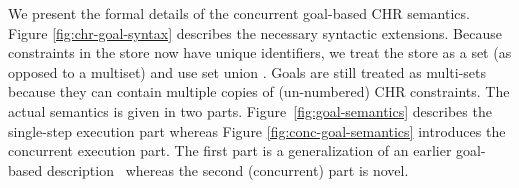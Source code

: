 \documentclass{tlp}
\begin{document}
We present the formal details of the concurrent goal-based CHR semantics. Figure 
\ref{fig:chr-goal-syntax} describes the necessary syntactic extensions. Because
constraints in the store now have unique identifiers, we treat the store as a
set (as opposed to a multiset) and use set union . Goals are still treated as multi-sets
because they can contain multiple copies of (un-numbered) CHR constraints.
The actual semantics is given in two parts. Figure~\ref{fig:goal-semantics} 
describes the single-step execution part whereas
Figure \ref{fig:conc-goal-semantics} introduces the concurrent execution part.
The first part is a generalization of an earlier goal-based description~\cite{greg:thesis}
whereas the second (concurrent) part is novel.



\end{document}
